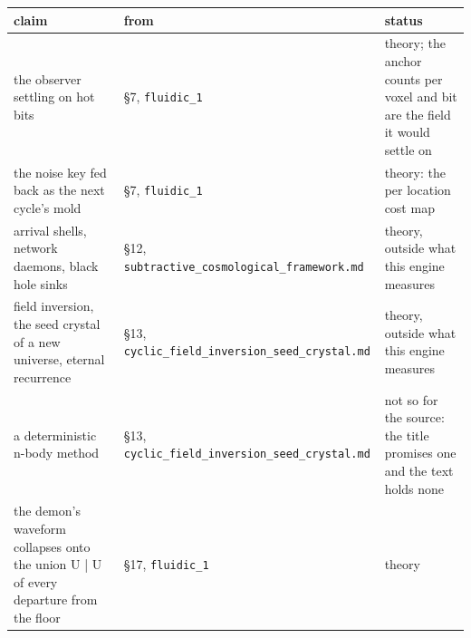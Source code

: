 {\small
\setlength{\tabcolsep}{6pt}
\begin{longtable}{>{\RaggedRight\arraybackslash}p{}>{\RaggedRight\arraybackslash}p{}>{\RaggedRight\arraybackslash}p{}}
\toprule
claim & from & status \\
\midrule
\endhead
the observer settling on hot bits & §7, \texttt{fluidic\_\allowbreak{}1} & theory; the anchor counts per voxel and bit are the field it would settle on \\
the noise key fed back as the next cycle's mold & §7, \texttt{fluidic\_\allowbreak{}1} & theory: the per location cost map \\
arrival shells, network daemons, black hole sinks & §12, \texttt{subtractive\_\allowbreak{}cosmological\_\allowbreak{}framework.\allowbreak{}md} & theory, outside what this engine measures \\
field inversion, the seed crystal of a new universe, eternal recurrence & §13, \texttt{cyclic\_\allowbreak{}field\_\allowbreak{}inversion\_\allowbreak{}seed\_\allowbreak{}crystal.\allowbreak{}md} & theory, outside what this engine measures \\
a deterministic n-body method & §13, \texttt{cyclic\_\allowbreak{}field\_\allowbreak{}inversion\_\allowbreak{}seed\_\allowbreak{}crystal.\allowbreak{}md} & not so for the source: the title promises one and the text holds none \\
the demon's waveform collapses onto the union U | U of every departure from the floor & §17, \texttt{fluidic\_\allowbreak{}1} & theory \\
\bottomrule
\end{longtable}
}
